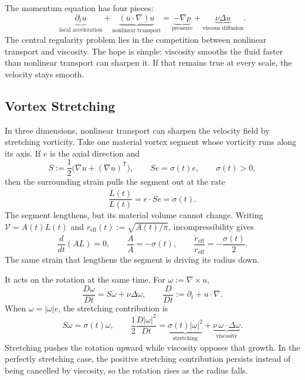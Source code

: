 
The momentum equation has four pieces:
\[
  \underbrace{\partial_t u}_{\text{local acceleration}}
  +
  \underbrace{(u\cdot\nabla)u}_{\text{nonlinear transport}}
  =
  \underbrace{-\nabla p}_{\text{pressure}}
  +
  \underbrace{\nu\Delta u}_{\text{viscous diffusion}}.
\]
The central regularity problem lies in the competition between nonlinear transport and viscosity.
The hope is simple: viscosity smooths the fluid faster than nonlinear transport can sharpen it.
If that remains true at every scale, the velocity stays smooth.

\subsection{Vortex Stretching}\label{sub:ThePerfectlyStretchingVortex}

In three dimensions, nonlinear transport can sharpen the velocity field by stretching vorticity.
Take one material vortex segment whose vorticity runs along its axis.
If \(e\) is the axial direction and
\[
  S:=\frac12\bigl(\nabla u+(\nabla u)^{\mathsf T}\bigr),
  \qquad
  Se=\sigma(t)e,
  \qquad
  \sigma(t)>0,
\]
then the surrounding strain pulls the segment out at the rate
\[
  \frac{\dot L(t)}{L(t)}
  =
  e\cdot Se
  =
  \sigma(t).
\]
The segment lengthens, but its material volume cannot change.
Writing \(\mathcal V=A(t)L(t)\) and \(r_{\mathrm{eff}}(t):=\sqrt{A(t)/\pi}\), incompressibility gives
\[
  \frac{d}{dt}(A L)=0,
  \qquad
  \frac{\dot A}{A}=-\sigma(t),
  \qquad
  \frac{\dot r_{\mathrm{eff}}}{r_{\mathrm{eff}}}
  =
  -\frac{\sigma(t)}{2}.
\]
The same strain that lengthens the segment is driving its radius down.

It acts on the rotation at the same time.
For \(\omega:=\nabla\times u\),
\[
  \frac{D\omega}{Dt}
  =
  S\omega+\nu\Delta\omega,
  \qquad
  \frac{D}{Dt}:=\partial_t+u\cdot\nabla.
\]
When \(\omega=|\omega|e\), the stretching contribution is
\[
  S\omega=\sigma(t)\omega,
  \qquad
  \frac12\frac{D|\omega|^2}{Dt}
  =
  \underbrace{\sigma(t)|\omega|^2}_{\text{stretching}}
  +
  \underbrace{\nu\,\omega\cdot\Delta\omega}_{\text{viscosity}}.
\]
Stretching pushes the rotation upward while viscosity opposes that growth.
In the perfectly stretching case, the positive stretching contribution persists instead of being cancelled by viscosity, so the rotation rises as the radius falls.

